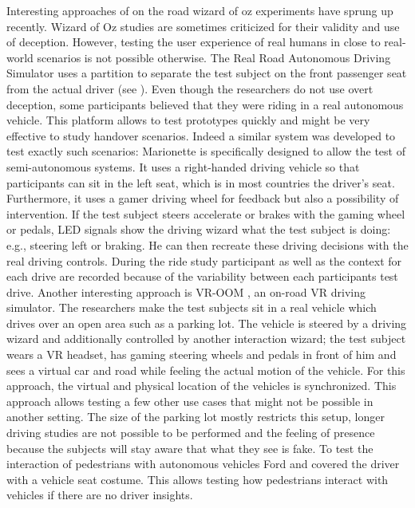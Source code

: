 Interesting approaches of on the road wizard of oz experiments have sprung up recently.  Wizard of Oz studies are sometimes criticized for their validity and use of deception\cite{Riek2012WizardGuidelines}. However, testing the user experience of real humans in close to real-world scenarios is not possible otherwise. The Real Road Autonomous Driving Simulator\cite{Baltodano2015} uses a partition to separate the test subject on the front passenger seat from the actual driver (see ). Even though the researchers do not use overt deception, some participants believed that they were riding in a real autonomous vehicle. This platform allows to test prototypes quickly and might be very effective to study handover scenarios. Indeed a similar system was developed to test exactly such scenarios: Marionette \cite{Wang2017} is specifically designed to allow the test of semi-autonomous systems. It uses a right-handed driving vehicle so that participants can sit in the left seat, which is in most countries the driver's seat. Furthermore, it uses a gamer driving wheel for feedback but also a possibility of intervention. If the test subject steers accelerate or brakes with the gaming wheel or pedals, LED signals show the driving wizard what the test subject is doing: e.g., steering left or braking. He can then recreate these driving decisions with the real driving controls. During the ride study participant as well as the context for each drive are recorded because of the variability between each participants test drive. Another interesting approach is VR-OOM \cite{Goedicke2018}, an on-road VR driving simulator. The researchers make the test subjects sit in a real vehicle which drives over an open area such as a parking lot. The vehicle is steered by a driving wizard and additionally controlled by another interaction wizard; the test subject wears a VR headset, has gaming steering wheels and pedals in front of him and sees a virtual car and road while feeling the actual motion of the vehicle. For this approach, the virtual and physical location of the vehicles is synchronized. This approach allows testing a few other use cases that might not be possible in another setting. The size of the parking lot mostly restricts this setup, longer driving studies are not possible to be performed and the feeling of presence because the subjects will stay aware that what they see is fake. 
To test the interaction of pedestrians with autonomous vehicles Ford \cite{FordMotorCompany2017FordPeople} and \cite{Rothenbucher2016} covered the driver with a vehicle seat costume. This allows testing how pedestrians interact with vehicles if there are no driver insights. 

